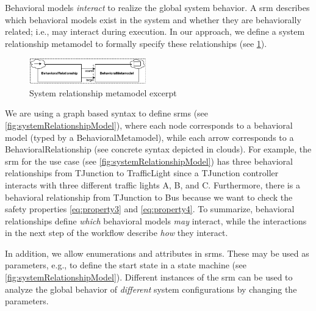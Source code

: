 \documentclass{jot}
\begin{document}
Behavioral models \emph{interact} to realize the global system behavior.
A \gls*{srm} describes which behavioral models exist in the system and whether they are behaviorally related; i.e., may interact during execution.
In our approach, we define a system relationship metamodel to formally specify these relationships (see \cref{fig:srm_metamodel_excerpt}).

\begin{figure}[h]
    \centering
    \includegraphics[width=0.45\textwidth]{figures/srm_metamodel_excerpt.pdf}
    \caption{System relationship metamodel excerpt}
    \label{fig:srm_metamodel_excerpt}
\end{figure}

We are using a graph based syntax to define \gls*{srm}s (see \cref{fig:systemRelationshipModel}), where each node corresponds to a behavioral model (typed by a \textsf{BehavioralMetamodel}), while each arrow corresponds to a \textsf{BehavioralRelationship} (see concrete syntax depicted in clouds).
For example, the \gls*{srm} for the use case (see \cref{fig:systemRelationshipModel}) has three behavioral relationships from \textsf{TJunction} to \textsf{TrafficLight} since a TJunction controller interacts with three different traffic lights A, B, and C.
Furthermore, there is a behavioral relationship from \textsf{TJunction} to \textsf{Bus} because we want to check the safety properties \eqref{eq:property3} and \eqref{eq:property4}. 
To summarize, behavioral relationships define \emph{which} behavioral models \emph{may} interact, while the interactions in the next step of the workflow describe \emph{how} they interact.

In addition, we allow enumerations and attributes in \gls*{srm}s.
These may be used as parameters, e.g., to define the start state in a state machine (see \cref{fig:systemRelationshipModel}).
Different instances of the \gls*{srm} can be used to analyze the global behavior of \emph{different} system configurations by changing the parameters.
\end{document}
